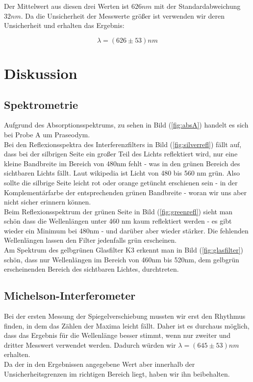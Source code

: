 \documentclass{article}
\begin{document}
Der Mittelwert aus diesen drei Werten ist $626nm$ mit der Standardabweichung $32nm$. Da die Unsicherheit der Messwerte größer ist verwenden wir deren Unsicherheit und erhalten das Ergebnis:

$$\boxed{\lambda=(626 \pm 53)nm}$$

\section{Diskussion}	

\subsection{Spektrometrie}

Aufgrund des Absorptionsspektrums, zu sehen in Bild (\ref{fig:absA}) handelt es sich bei Probe A um Praseodym. \\

Bei den Reflexionsspektra des Interferenzfilters in Bild (\ref{fig:silverrefl}) fällt auf, dass bei der silbrigen Seite ein großer Teil des Lichts reflektiert wird, nur eine kleine Bandbreite im Bereich von 480nm fehlt - was in den grünen Bereich des sichtbaren Lichts fällt. Laut wikipedia ist Licht von 480 bis 560 nm grün. Also sollte die silbrige Seite leicht rot oder orange getüncht erschienen sein - in der Komplementärfarbe der entsprechenden grünen Bandbreite - woran wir uns aber nicht sicher erinnern können. \\
Beim Reflexionsspektrum der grünen Seite in Bild (\ref{fig:greenrefl}) sieht man schön dass die Wellenlängen unter 460 nm kaum reflektiert werden - es gibt wieder ein Minimum bei 480nm - und darüber aber wieder stärker. Die fehlenden Wellenlängen lassen den Filter jedenfalls grün erscheinen.\\
Am Spektrum des gelbgrünen Glasfilter K3 erkennt man in Bild (\ref{fig:glasfilter}) schön, dass nur Wellenlängen im Bereich von 460nm bis 520nm, dem gelbgrün erscheinenden Bereich des sichtbaren Lichtes, durchtreten.
\subsection{Michelson-Interferometer}
Bei der ersten Messung der Spiegelverschiebung mussten wir erst den Rhythmus finden, in dem das Zählen der Maxima leicht fällt. Daher ist es durchaus möglich, dass das Ergebnis für die Wellenlänge besser stimmt, wenn nur zweiter und dritter Messwert verwendet werden. Dadurch würden wir $\lambda=(645 \pm 53)nm$ erhalten.\\
Da der in den Ergebnissen angegebene Wert aber innerhalb der Unsicherheitsgrenzen im richtigen Bereich liegt, haben wir ihn beibehalten.
																								
\end{document}
